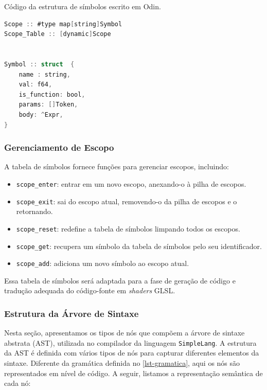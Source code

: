 \documentclass[english, 
               brazil, 
               bsc] %
               {dcomp-abntex2}
\begin{document}
\begin{codigo}[htb]
\caption{\small Código da estrutura de símbolos escrito em Odin.}
\label{struct-symbol}
\begin{lstlisting}[language=C]
Scope :: #type map[string]Symbol
Scope_Table :: [dynamic]Scope


Symbol :: struct  {
    name : string,
    val: f64,
    is_function: bool,
    params: []Token,
    body: ^Expr,
}

\end{lstlisting}
\end{codigo}


\subsubsection{Gerenciamento de Escopo}

A tabela de símbolos fornece funções para gerenciar escopos, incluindo:
\begin{itemize}
    \item \texttt{scope\_enter}: entrar em um novo escopo, anexando-o à pilha de escopos.
    \item \texttt{scope\_exit}: sai do escopo atual, removendo-o da pilha de escopos e o retornando.
    \item \texttt{scope\_reset}: redefine a tabela de símbolos limpando todos os escopos.
    \item \texttt{scope\_get}: recupera um símbolo da tabela de símbolos pelo seu identificador.
    \item \texttt{scope\_add}: adiciona um novo símbolo ao escopo atual.
\end{itemize}




Essa tabela de símbolos será adaptada para a fase de geração de código e tradução adequada do código-fonte em \textit{shaders} GLSL.




\subsubsection{Estrutura da Árvore de Sintaxe}
Nesta seção, apresentamos os tipos de nós que compõem a árvore de sintaxe abstrata (AST), utilizada no compilador da linguagem \texttt{SimpleLang}. A estrutura da AST é definida com vários tipos de nós para capturar diferentes elementos da sintaxe. Diferente da gramática definida no \autoref{lst-gramatica}, aqui os nós são representados em nível de código. A seguir, listamos a representação semântica de cada nó:
\end{document}

